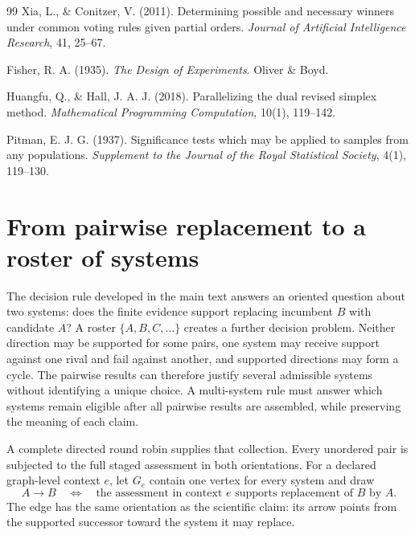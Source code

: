 \documentclass[11pt]{article}
\theoremstyle{remark}
\begin{document}
\begin{thebibliography}{99}
Xia, L., \& Conitzer, V. (2011).
Determining possible and necessary winners under common voting rules given partial orders.
\emph{Journal of Artificial Intelligence Research}, 41, 25--67.

Fisher, R. A. (1935).
\emph{The Design of Experiments}.
Oliver \& Boyd.

Huangfu, Q., \& Hall, J. A. J. (2018).
Parallelizing the dual revised simplex method.
\emph{Mathematical Programming Computation}, 10(1), 119--142.

Pitman, E. J. G. (1937).
Significance tests which may be applied to samples from any populations.
\emph{Supplement to the Journal of the Royal Statistical Society}, 4(1), 119--130.

\end{thebibliography}

\clearpage

\appendix

\section{From pairwise replacement to a roster of systems}
\label{app:multi-system}

The decision rule developed in the main text answers an oriented question
about two systems: does the finite evidence support replacing incumbent $B$
with candidate $A$? A roster $\{A,B,C,\ldots\}$ creates a further decision
problem. Neither direction may be supported for some pairs, one system may
receive support against one rival and fail against another, and supported
directions may form a cycle. The pairwise results can therefore justify
several admissible systems without identifying a unique choice. A
multi-system rule must answer which systems remain eligible after all pairwise
results are assembled, while preserving the meaning of each claim.

A complete directed round robin supplies that collection. Every unordered
pair is subjected to the full staged assessment in both orientations. For a
declared graph-level context $e$, let $G_e$ contain one vertex for every system
and draw
\[
A\longrightarrow B
\quad\Longleftrightarrow\quad
\text{the assessment in context $e$ supports replacement of $B$ by $A$}.
\]
The edge has the same orientation as the scientific claim: its arrow points
from the supported successor toward the system it may replace.
\end{document}
